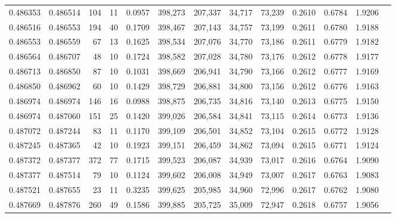 \begin{tabular}{rrrrrrrrrrrrr}
0.486353 & 0.486514 &   104 &  11 &                                     0.0957 & 398,273 & 207,337 &  34,717 &  73,239 & 0.2610 & 0.6784 & 1.9206 \\
0.486516 & 0.486553 &   194 &  40 &                                     0.1709 & 398,467 & 207,143 &  34,757 &  73,199 & 0.2611 & 0.6780 & 1.9188 \\
0.486553 & 0.486559 &    67 &  13 &                                     0.1625 & 398,534 & 207,076 &  34,770 &  73,186 & 0.2611 & 0.6779 & 1.9182 \\
0.486564 & 0.486707 &    48 &  10 &                                     0.1724 & 398,582 & 207,028 &  34,780 &  73,176 & 0.2612 & 0.6778 & 1.9177 \\
0.486713 & 0.486850 &    87 &  10 &                                     0.1031 & 398,669 & 206,941 &  34,790 &  73,166 & 0.2612 & 0.6777 & 1.9169 \\
0.486850 & 0.486962 &    60 &  10 &                                     0.1429 & 398,729 & 206,881 &  34,800 &  73,156 & 0.2612 & 0.6776 & 1.9163 \\
0.486974 & 0.486974 &   146 &  16 &                                     0.0988 & 398,875 & 206,735 &  34,816 &  73,140 & 0.2613 & 0.6775 & 1.9150 \\
0.486974 & 0.487060 &   151 &  25 &                                     0.1420 & 399,026 & 206,584 &  34,841 &  73,115 & 0.2614 & 0.6773 & 1.9136 \\
0.487072 & 0.487244 &    83 &  11 &                                     0.1170 & 399,109 & 206,501 &  34,852 &  73,104 & 0.2615 & 0.6772 & 1.9128 \\
0.487245 & 0.487365 &    42 &  10 &                                     0.1923 & 399,151 & 206,459 &  34,862 &  73,094 & 0.2615 & 0.6771 & 1.9124 \\
0.487372 & 0.487377 &   372 &  77 &                                     0.1715 & 399,523 & 206,087 &  34,939 &  73,017 & 0.2616 & 0.6764 & 1.9090 \\
0.487377 & 0.487514 &    79 &  10 &                                     0.1124 & 399,602 & 206,008 &  34,949 &  73,007 & 0.2617 & 0.6763 & 1.9083 \\
0.487521 & 0.487655 &    23 &  11 &                                     0.3235 & 399,625 & 205,985 &  34,960 &  72,996 & 0.2617 & 0.6762 & 1.9080 \\
0.487669 & 0.487876 &   260 &  49 &                                     0.1586 & 399,885 & 205,725 &  35,009 &  72,947 & 0.2618 & 0.6757 & 1.9056 \\

\end{tabular}
